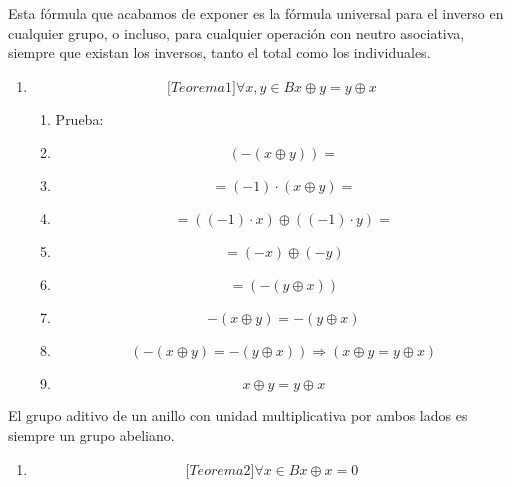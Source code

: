 \begin{enumerate}
\begin{enumerate}
\begin{enumerate}
      Esta fórmula que acabamos de exponer es la fórmula universal para
      el inverso en cualquier grupo, o in\-cluso, para cualquier
      operación con neutro asociativa, siempre que existan los inversos,
      tanto el total como los individuales.

      \begin{enumerate}
      \def\labelenumiv{\arabic{enumiv}.}
      \setcounter{enumiv}{37}
      \item
        \[{\lbrack{{Teorema}1}\rbrack}\forall x,{y \in B}x \oplus {y = y} \oplus x\]

        \begin{enumerate}
        \def\labelenumv{\arabic{enumv}.}
        \tightlist
        \item
          Prueba:
        \item
          \[\left( {- \left( {x \oplus y} \right)} \right) =\]
        \item
          \[{= {\left( {- 1} \right) \cdot \left( {x \oplus y} \right)}} =\]
        \item
          \[{= \left( {\left( {- 1} \right) \cdot x} \right)} \oplus {\left( {\left( {- 1} \right) \cdot y} \right) =}\]
        \item
          \[{= \left( {- x} \right)} \oplus \left( {- y} \right)\]
        \item
          \[= \left( {- \left( {y \oplus x} \right)} \right)\]
        \item
          \[{- \left( {x \oplus y} \right)} = {- \left( {y \oplus x} \right)}\]
        \item
          \[\left( {{- \left( {x \oplus y} \right)} = {- \left( {y \oplus x} \right)}} \right)\Rightarrow\left( {x \oplus {y = y} \oplus x} \right)\]
        \item
          \[x \oplus {y = y} \oplus x\]
        \end{enumerate}
      \end{enumerate}

      El grupo aditivo de un anillo con unidad multiplicativa por ambos
      lados es siempre un grupo abeliano.

      \begin{enumerate}
      \def\labelenumiv{\arabic{enumiv}.}
      \setcounter{enumiv}{38}
      \item
        \[{\lbrack{{Teorema}2}\rbrack}\forall{x \in B}x \oplus {x = 0}\]


\end{enumerate}
\end{enumerate}
\end{enumerate}
\end{enumerate}
